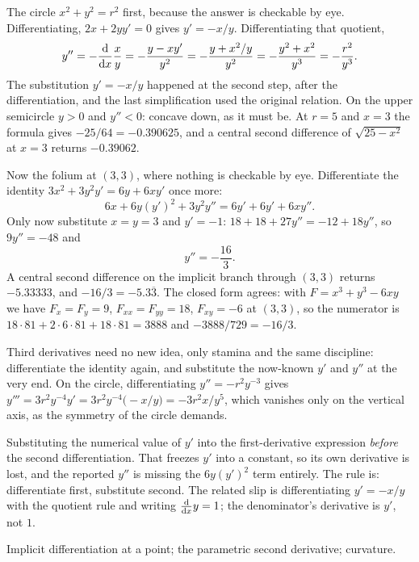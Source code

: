 \begin{worked}
The circle $x^{2}+y^{2}=r^{2}$ first, because the answer is checkable by eye. Differentiating, $2x+2yy'=0$ gives $y'=-x/y$. Differentiating that quotient,
\[
y''=-\frac{\mathrm{d}}{\mathrm{d}x}\frac{x}{y}=-\frac{y-xy'}{y^{2}}=-\frac{y+x^{2}/y}{y^{2}}=-\frac{y^{2}+x^{2}}{y^{3}}=-\frac{r^{2}}{y^{3}} .
\]
The substitution $y'=-x/y$ happened at the second step, after the differentiation, and the last simplification used the original relation. On the upper semicircle $y>0$ and $y''<0$: concave down, as it must be. At $r=5$ and $x=3$ the formula gives $-25/64=-0.390625$, and a central second difference of $\sqrt{25-x^{2}}$ at $x=3$ returns $-0.39062$.

Now the folium at $(3,3)$, where nothing is checkable by eye. Differentiate the identity $3x^{2}+3y^{2}y'=6y+6xy'$ once more:
\[
6x+6y(y')^{2}+3y^{2}y''=6y'+6y'+6xy'' .
\]
Only now substitute $x=y=3$ and $y'=-1$: $18+18+27y''=-12+18y''$, so $9y''=-48$ and
\[
y''=-\frac{16}{3}.
\]
A central second difference on the implicit branch through $(3,3)$ returns $-5.33333$, and $-16/3=-5.3\overline{3}$. The closed form agrees: with $F=x^{3}+y^{3}-6xy$ we have $F_{x}=F_{y}=9$, $F_{xx}=F_{yy}=18$, $F_{xy}=-6$ at $(3,3)$, so the numerator is $18\cdot81+2\cdot6\cdot81+18\cdot81=3888$ and $-3888/729=-16/3$.

Third derivatives need no new idea, only stamina and the same discipline: differentiate the identity again, and substitute the now-known $y'$ and $y''$ at the very end. On the circle, differentiating $y''=-r^{2}y^{-3}$ gives $y'''=3r^{2}y^{-4}y'=3r^{2}y^{-4}\bigl(-x/y\bigr)=-3r^{2}x/y^{5}$, which vanishes only on the vertical axis, as the symmetry of the circle demands.
\end{worked}

\begin{trap}
Substituting the numerical value of $y'$ into the first-derivative expression \emph{before} the second differentiation. That freezes $y'$ into a constant, so its own derivative is lost, and the reported $y''$ is missing the $6y(y')^{2}$ term entirely. The rule is: differentiate first, substitute second. The related slip is differentiating $y'=-x/y$ with the quotient rule and writing $\frac{\mathrm{d}}{\mathrm{d}x}y=1$; the denominator's derivative is $y'$, not $1$.
\end{trap}

\begin{seealsob}Implicit differentiation at a point; the parametric second derivative; curvature.\end{seealsob}


